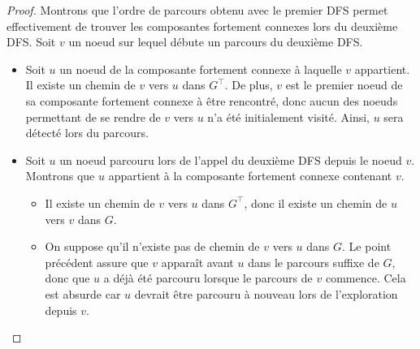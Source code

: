\documentclass[11pt,a4paper]{article}
\begin{document}
\begin{proof}
  Montrons que l'ordre de parcours obtenu avec le premier DFS permet effectivement de trouver les composantes fortement connexes lors du deuxième DFS. Soit \(v\) un noeud sur lequel débute un parcours du deuxième DFS.
  \begin{itemize}
    \item Soit \(u\) un noeud de la composante fortement connexe à laquelle \(v\) appartient. Il existe un chemin de \(v\) vers \(u\) dans \(G^\top\). De plus, \(v\) est le premier noeud de sa composante fortement connexe à être rencontré, donc aucun des noeuds permettant de se rendre de \(v\) vers \(u\) n'a été initialement visité. Ainsi, \(u\) sera détecté lors du parcours.
    \item Soit \(u\) un noeud parcouru lors de l'appel du deuxième DFS depuis le noeud \(v\). Montrons que \(u\) appartient à la composante fortement connexe contenant \(v\).
      \begin{itemize}
        \item Il existe un chemin de \(v\) vers \(u\) dans \(G^\top\), donc il existe un chemin de \(u\) vers \(v\) dans \(G\).
        \item On suppose qu'il n'existe pas de chemin de \(v\) vers \(u\) dans \(G\). Le point précédent assure que \(v\) apparaît avant \(u\) dans le parcours suffixe de \(G\), donc que \(u\) a déjà été parcouru lorsque le parcours de \(v\) commence. Cela est absurde car \(u\) devrait être parcouru à nouveau lors de l'exploration depuis \(v\).
      \end{itemize}
  \end{itemize}
\end{proof}


\end{document}
